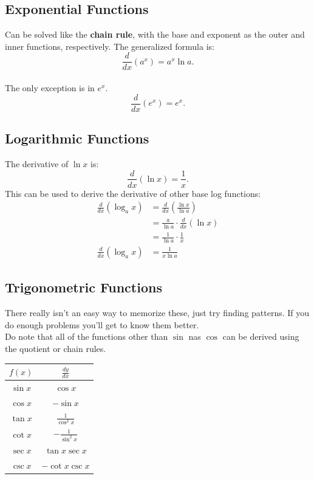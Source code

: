 \documentclass[12pt]{article}
\begin{document}
        \subsection{Exponential Functions}
            Can be solved like the \textbf{chain rule}, with the base and exponent as the outer and inner functions, respectively. The generalized formula is:
            \[ \frac{d}{dx} \left( a^x \right) = a^x \ln{a}. \]
            \\ The only exception is in $e^x$.
            \[ \frac{d}{dx} \left( e^x \right) = e^x.\]

        \subsection{Logarithmic Functions}
            The derivative of $\ln{x}$ is:
            \[ \frac{d}{dx} \left( \ln{x} \right) = \frac{1}{x}. \]
            This can be used to derive the derivative of other base log functions:
            \begin{align*}
                \frac{d}{dx} \left( \log_a{x} \right) &= \frac{d}{dx} \left( \frac{\ln{x}}{\ln{a}} \right) \\[6pt]
                &= \frac{a}{\ln{a}} \cdot \frac{d}{dx} \left( \ln{x} \right) \\[6pt]
                &= \frac{1}{\ln{a}} \cdot \frac{1}{x} \\[6pt]
                \frac{d}{dx} \left( \log_a{x} \right) &= \frac{1}{x \ln{a}}
            \end{align*}

        \subsection{Trigonometric Functions}
            There really isn't an easy way to memorize these, just try finding patterns. If you do enough problems you'll get to know them better.
            \\ Do note that all of the functions other than $\sin$ nas $\cos$ can be derived using the quotient or chain rules.
            \begin{center}
                \begin{tabular}{|c|c|}
                    \hline
                    $f(x)$ & $\frac{dy}{dx}$ \\
                    \hline \hline
                    $\sin{x}$ & $\cos{x}$ \\
                    \hline
                    $\cos{x}$ & $-\sin{x}$ \\
                    \hline
                    $\tan{x}$ & $\frac{1}{\cos^2{x}}$ \\
                    \hline \hline
                    $\cot{x}$ & $-\frac{1}{\sin^2{x}}$ \\
                    \hline
                    $\sec{x}$ & $\tan{x} \sec{x}$ \\
                    \hline
                    $\csc{x}$ & $-\cot{x} \csc{x}$ \\
                    \hline
                \end{tabular}
            \end{center}
\end{document}
